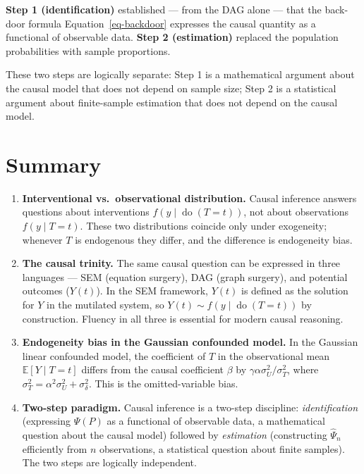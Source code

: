 \documentclass[
  a4paper,
]{book}
\newcommand{\doop}{\operatorname{do}}
\newcommand{\E}{\mathbb{E}}
\begin{document}
\begin{tcolorbox}[enhanced jigsaw, arc=.35mm, bottomrule=.15mm, bottomtitle=1mm, breakable, colback=white, colbacktitle=quarto-callout-note-color!10!white, colframe=quarto-callout-note-color-frame, coltitle=black, left=2mm, leftrule=.75mm, opacityback=0, opacitybacktitle=0.6, rightrule=.15mm, title={The Two Steps, Concretely}, titlerule=0mm, toprule=.15mm, toptitle=1mm]

\textbf{Step 1 (identification)} established --- from the DAG alone ---
that the back-door formula Equation~\ref{eq-backdoor} expresses the
causal quantity as a functional of observable data. \textbf{Step 2
(estimation)} replaced the population probabilities with sample
proportions.

These two steps are logically separate: Step 1 is a mathematical
argument about the causal model that does not depend on sample size;
Step 2 is a statistical argument about finite-sample estimation that
does not depend on the causal model.

\end{tcolorbox}

\section{Summary}\label{summary}

\begin{enumerate}
\def\labelenumi{\arabic{enumi}.}
\item
  \textbf{Interventional vs.~observational distribution.} Causal
  inference answers questions about interventions
  \(f(y \mid \doop(T{=}t))\), not about observations
  \(f(y \mid T{=}t)\). These two distributions coincide only under
  exogeneity; whenever \(T\) is endogenous they differ, and the
  difference is endogeneity bias.
\item
  \textbf{The causal trinity.} The same causal question can be expressed
  in three languages --- SEM (equation surgery), DAG (graph surgery),
  and potential outcomes (\(Y(t)\)). In the SEM framework, \(Y(t)\) is
  defined as the solution for \(Y\) in the mutilated system, so
  \(Y(t) \sim f(y \mid \doop(T{=}t))\) by construction. Fluency in all
  three is essential for modern causal reasoning.
\item
  \textbf{Endogeneity bias in the Gaussian confounded model.} In the
  Gaussian linear confounded model, the coefficient of \(T\) in the
  observational mean \(\E[Y \mid T{=}t]\) differs from the causal
  coefficient \(\beta\) by \(\gamma\alpha\sigma_U^2/\sigma_T^2\), where
  \(\sigma_T^2 = \alpha^2\sigma_U^2 + \sigma_\delta^2\). This is the
  omitted-variable bias.
\item
  \textbf{Two-step paradigm.} Causal inference is a two-step discipline:
  \emph{identification} (expressing \(\Psi(P)\) as a functional of
  observable data, a mathematical question about the causal model)
  followed by \emph{estimation} (constructing \(\hat{\Psi}_n\)
  efficiently from \(n\) observations, a statistical question about
  finite samples). The two steps are logically independent.
\end{enumerate}
\end{document}
